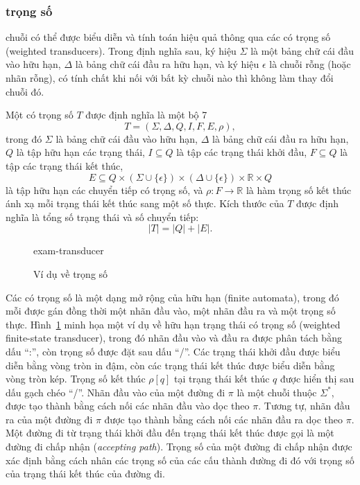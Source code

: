 \subsubsection{\protect{} trọng số}

 chuỗi có thể được biểu diễn và tính toán hiệu quả thông qua các  có trọng số (weighted transducers). Trong định nghĩa sau, ký hiệu $\Sigma$ là một bảng chữ cái đầu vào hữu hạn, $\Delta$ là bảng chữ cái đầu ra hữu hạn, và ký hiệu $\epsilon$ là chuỗi rỗng (hoặc nhãn rỗng), có tính chất khi nối với bất kỳ chuỗi nào thì không làm thay đổi chuỗi đó.

\begin{defn}
Một  có trọng số $T$ được định nghĩa là một bộ 7
\[
T=(\Sigma,\Delta,Q,I,F,E,\rho),
\]
trong đó $\Sigma$ là bảng chữ cái đầu vào hữu hạn, $\Delta$ là bảng chữ cái đầu ra hữu hạn, $Q$ là tập hữu hạn các trạng thái, $I\subseteq Q$ là tập các trạng thái khởi đầu, $F\subseteq Q$ là tập các trạng thái kết thúc, 
\[
E \subseteq Q \times (\Sigma \cup \{\epsilon\}) \times (\Delta \cup \{\epsilon\}) \times \mathbb{R} \times Q
\]
là tập hữu hạn các chuyển tiếp có trọng số, và $\rho : F \to \mathbb{R}$ là hàm trọng số kết thúc ánh xạ mỗi trạng thái kết thúc sang một số thực. Kích thước của  $T$ được định nghĩa là tổng số trạng thái và số chuyển tiếp:
\[
|T| = |Q| + |E|.
\]
\end{defn}

\begin{figure}[htbp]
    \centering
    {exam-transducer}
    \caption{Ví dụ về  trọng số}
    \label{fig:wfst-example}
\end{figure}

Các  có trọng số là một dạng mở rộng của  hữu hạn (finite automata), trong đó mỗi  được gán đồng thời một nhãn đầu vào, một nhãn đầu ra và một trọng số thực. Hình~\ref{fig:wfst-example} minh họa một ví dụ về  hữu hạn trạng thái có trọng số (weighted finite-state transducer), trong đó nhãn đầu vào và đầu ra được phân tách bằng dấu ``:'', còn trọng số được đặt sau dấu ``/''.
Các trạng thái khởi đầu được biểu diễn bằng vòng tròn in đậm, còn các trạng thái kết thúc được biểu diễn bằng vòng tròn kép. Trọng số kết thúc $\rho[q]$ tại trạng thái kết thúc $q$ được hiển thị sau dấu gạch chéo “/”.
Nhãn đầu vào của một đường đi $\pi$ là một chuỗi thuộc $\Sigma^{*}$, được tạo thành bằng cách nối các nhãn đầu vào dọc theo $\pi$. Tương tự, nhãn đầu ra của một đường đi $\pi$ được tạo thành bằng cách nối các nhãn đầu ra dọc theo $\pi$. Một đường đi từ trạng thái khởi đầu đến trạng thái kết thúc được gọi là một đường đi chấp nhận (\emph{accepting path}). Trọng số của một đường đi chấp nhận được xác định bằng cách nhân các trọng số của các  cấu thành đường đi đó với trọng số của trạng thái kết thúc của đường đi.


